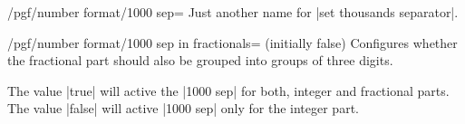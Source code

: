 \begin{stylekey}{/pgf/number format/1000 sep=}
    Just another name for |set thousands separator|.
\end{stylekey}

\begin{key}{/pgf/number format/1000 sep in fractionals= (initially false)}
    Configures whether the fractional part should also be grouped into groups
    of three digits.

    The value |true| will active the |1000 sep| for both, integer and
    fractional parts. The value |false| will active |1000 sep| only for the
    integer part.
\begin{codeexample}[pre={\begin{lateximage}},post={\end{lateximage}}]
\end{codeexample}
\begin{codeexample}[pre={\begin{lateximage}},post={\end{lateximage}}]
\end{codeexample}
\end{key}

